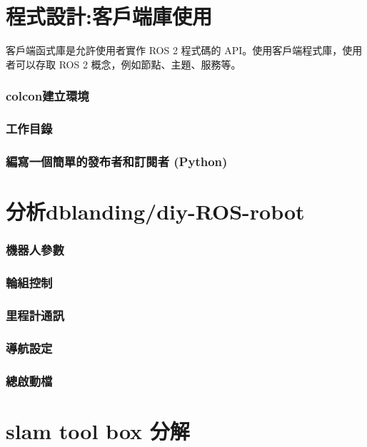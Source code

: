 \documentclass{article}
\begin{document}
\part{程式設計:客戶端庫使用}
客戶端函式庫是允許使用者實作 ROS 2 程式碼的 API。使用客戶端程式庫，使用者可以存取 ROS 2 概念，例如節點、主題、服務等。
\section{colcon建立環境}

\section{工作目錄}

\section{編寫一個簡單的發布者和訂閱者 (Python)}




\part{分析dblanding/diy-ROS-robot}

\section{機器人參數}

\section{輪組控制}

\section{里程計通訊}

\section{導航設定}

\section{總啟動檔}


\part{slam tool box 分解}
\end{document}
